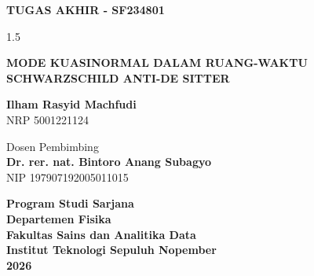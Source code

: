  \begin{large}
    \textbf{TUGAS AKHIR - SF234801}
  \end{large}

  \vspace{\fill}

  \begin{spacing}{1.5}
    \begin{Large}
      \textbf{MODE KUASINORMAL DALAM RUANG-WAKTU SCHWARZSCHILD ANTI-DE SITTER}
    \end{Large}
  \end{spacing}

  \vspace{\fill}

  \begin{large}
    \textbf{Ilham Rasyid Machfudi} \\
    \textmd{NRP 5001221124}
  \end{large}

  \vspace{\fill}

  \begin{large}
    \textmd{Dosen Pembimbing} \\
    \textbf{Dr. rer. nat. Bintoro Anang Subagyo} \\
    \textmd{NIP 197907192005011015} \\
  \end{large}

  \vspace{\fill}

  \begin{large}
    \textbf{Program Studi Sarjana} \\
    \textbf{Departemen Fisika} \\
    \textbf{Fakultas Sains dan Analitika Data} \\
    \textbf{Institut Teknologi Sepuluh Nopember} \\
    \textbf{2026}
  \end{large}